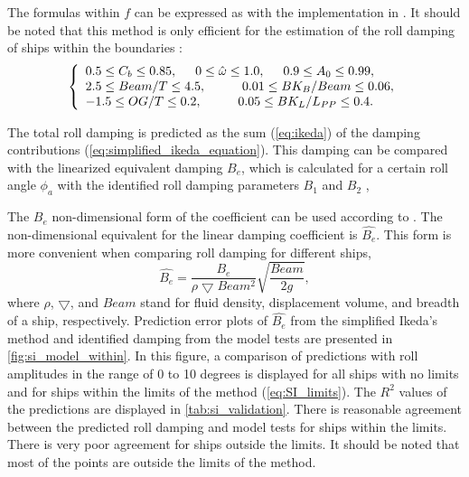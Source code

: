 \noindent The formulas within $f$ can be expressed as \textcite{ikeda_velocity_1979, kawahara_simple_2011} with the implementation in \textcite{alexandersson_Rolldecay-estimators_2022}.
It should be noted that this method is only efficient for the estimation of the roll damping of ships within the boundaries \parencite{kawahara_simple_2011}:
\begin{equation}
    \label{eq:SI_limits}
     \left\{
     \begin{array}{ll}
    0.5 \leq C_b \leq 0.85,\hspace{0.5cm} 
    0 \leq \hat{\omega} \leq 1.0,
    \hspace{0.5cm}
    0.9 \leq A_0 \leq 0.99,\\
    2.5\leq Beam/T \leq 4.5, \hspace{1cm}
    0.01 \leq BK_B/Beam \leq 0.06, \\
        -1.5 \leq OG/T \leq 0.2,
     \hspace{1cm}
    0.05 \leq BK_L/L_{PP} \leq 0.4.
    \end{array}
    \right.
\end{equation}

\noindent The total roll damping is predicted as the sum (\autoref{eq:ikeda}) of the damping contributions (\autoref{eq:simplified_ikeda_equation}). This damping can be compared with the linearized equivalent damping $B_e$, which is calculated for a certain roll angle $\phi_a$ with the identified roll damping parameters $B_1$ and $B_2$ \cite{himeno_prediction_1981},


\noindent The $B_e$ non-dimensional form of the coefficient can be used according to \textcite{himeno_prediction_1981}. The non-dimensional equivalent for the linear damping coefficient is $\hat{B_e}$. This form is more convenient when comparing roll damping for different ships,
\begin{equation} \label{eq:be_eqvalent}
    \hat{B_e} = \frac{B_e}{\rho \bigtriangledown Beam^2} \sqrt{\frac{Beam}{2g}},
\end{equation}
\noindent where $\rho$, $\bigtriangledown$, and $Beam$ stand for fluid density, displacement volume, and breadth of a ship, respectively. Prediction error plots of $\hat{B_e}$ from the simplified Ikeda's method and identified damping from the model tests are presented in \autoref{fig:si_model_within}. In this figure, a comparison of predictions with roll amplitudes in the range of 0 to 10 degrees is displayed for all ships with no limits and for ships within the limits of the method (\autoref{eq:SI_limits}). The $R^2$ values of the predictions are displayed in \autoref{tab:si_validation}. There is reasonable agreement between the predicted roll damping and model tests for ships within the limits. There is very poor agreement for ships outside the limits. It should be noted that most of the points are outside the limits of the method.

